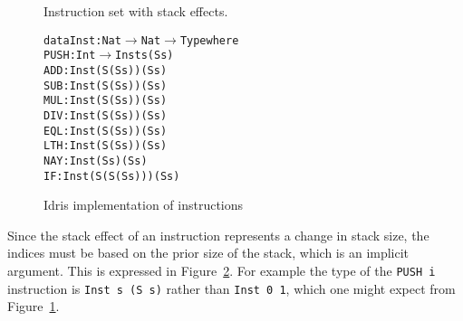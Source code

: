 \begin{figure}
\caption{Instruction set with stack effects.}
\label{fig:inst_set_with_effect}
\end{figure}

\begin{figure}
\begin{alltt}
data Inst : Nat \(\rightarrow\) Nat \(\rightarrow\) Type where
  PUSH : Int \(\rightarrow\) Inst          s    (S s)
  ADD  :        Inst    (S (S s))  (S s)
  SUB  :        Inst    (S (S s))  (S s)
  MUL  :        Inst    (S (S s))  (S s)
  DIV  :        Inst    (S (S s))  (S s)
  EQL  :        Inst    (S (S s))  (S s)
  LTH  :        Inst    (S (S s))  (S s)
  NAY  :        Inst       (S s)   (S s)
  IF   :        Inst (S (S (S s))) (S s)
\end{alltt}
\caption{Idris implementation of instructions}
\label{fig:idris_inst_set}
\end{figure}

Since the stack effect of an instruction represents a change in stack size, the indices must be based on the prior size of the stack, which is an implicit argument. This is expressed in Figure~\ref{fig:idris_inst_set}. For example the type of the \texttt{PUSH i} instruction is \texttt{Inst s (S s)} rather than \texttt{Inst 0 1}, which one might expect from Figure~\ref{fig:inst_set_with_effect}. 

